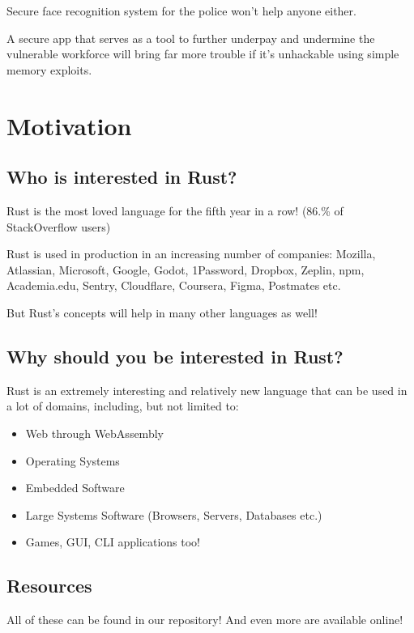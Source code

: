 \documentclass[usenames,twocolumn,dvipsnames,10pt,a4wide]{article}
\begin{document}
Secure face recognition system for the police won't help anyone either.


A secure app that serves as a tool to further underpay and
undermine the vulnerable workforce will bring far more trouble
if it's unhackable using simple memory exploits.



\section{Motivation}%
 
\subsection{Who is interested in Rust?}
	Rust is the most loved language for the fifth year in a row!
	\footnotesize{(86.\% of StackOverflow users)}

	

	Rust is used in production in an increasing number
	of companies: Mozilla, Atlassian, Microsoft, Google,
	Godot, 1Password, Dropbox, Zeplin, npm, Academia.edu,
	Sentry, Cloudflare, Coursera, Figma, Postmates etc.

	

	But Rust's concepts will help in many
	other languages as well!
 

\subsection{Why should you be interested in Rust?}
	Rust is an extremely interesting and relatively
	new language that can be used in a lot of
	domains, including, but not limited to:
	
	\begin{itemize}[label=$\bullet$]
		\item Web through WebAssembly
		\item Operating Systems
		\item Embedded Software
		\item Large Systems Software
			(Browsers, Servers, Databases etc.)
		\item Games, GUI, CLI applications too!
	\end{itemize}


\subsection{Resources}
	All of these can be found in our repository!
	And even more are available online!
	
\end{document}
